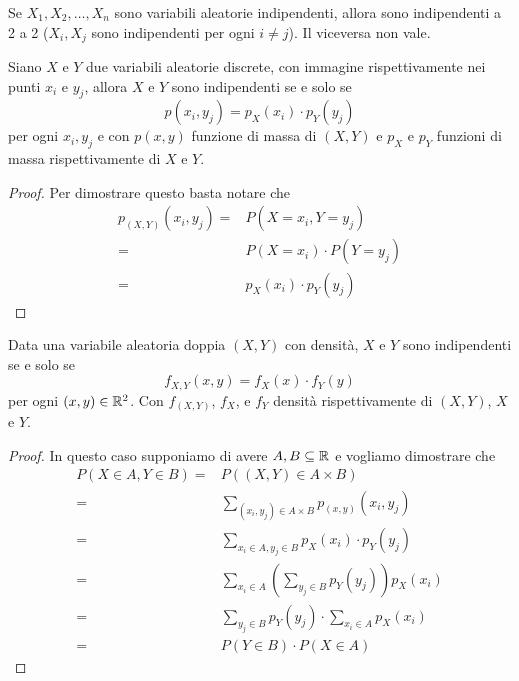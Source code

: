 \begin{observation}
	Se $X_1, X_2, \dots, X_n$ sono variabili aleatorie indipendenti, allora sono indipendenti a 2
	a 2 ($X_i, X_j$ sono indipendenti per ogni $i \neq j$). Il viceversa non vale.
\end{observation}

\begin{proposition}
	Siano $X$ e $Y$ due variabili aleatorie discrete, con immagine rispettivamente nei punti $x_i$
	e $y_j$, allora $X$ e $Y$ sono indipendenti se e solo se
	\[ p(x_i, y_j) = p_X (x_i) \cdot p_Y (y_j) \]
	per ogni $x_i, y_j$ e con $p(x,y)$ funzione di massa di $(X, Y)$ e $p_X$ e $p_Y$ funzioni di
	massa rispettivamente di $X$ e $Y$.
	\begin{proof}
		Per dimostrare questo basta notare che
		\begin{align*}
			p_{(X,Y)} (x_i, y_j) = & P(X = x_i, Y = y_j)         \\
			=                      & P(X = x_i) \cdot P(Y = y_j) \\
			=                      & p_X (x_i) \cdot p_Y (y_j)
		\end{align*}
	\end{proof}

	Data una variabile aleatoria doppia $(X, Y)$ con densità, $X$ e $Y$ sono indipendenti se e
	solo se
	\[ f_{X,Y} (x,y) = f_X (x) \cdot f_Y (y) \]
	per ogni $(x, y) \in \mathbb{R}^2$. Con $f_{(X,Y)}$, $f_X$, e $f_Y$ densità rispettivamente di
	$(X,Y)$, $X$ e $Y$.
	\begin{proof}
		In questo caso supponiamo di avere $A, B \subseteq \mathbb{R}$ e vogliamo dimostrare che
		\begin{align*}
			P(X \in A, Y \in B) = & P((X,Y) \in A \times B)                                    \\
			=                     & \sum_{(x_i, y_j) \in A \times B} p_{(x,y)} (x_i, y_j)      \\
			=                     & \sum_{x_i \in A, y_j \in B} p_X(x_i) \cdot p_Y(y_j)        \\
			=                     & \sum_{x_i \in A} \left( \sum_{y_j \in B} p_Y(y_j) \right)
			p_X(x_i)                                                                           \\
			=                     & \sum_{y_j \in B} p_Y(y_j) \cdot \sum_{x_i \in A} p_X (x_i) \\
			=                     & P(Y \in B) \cdot P(X \in A)
		\end{align*}
	\end{proof}
\end{proposition}

